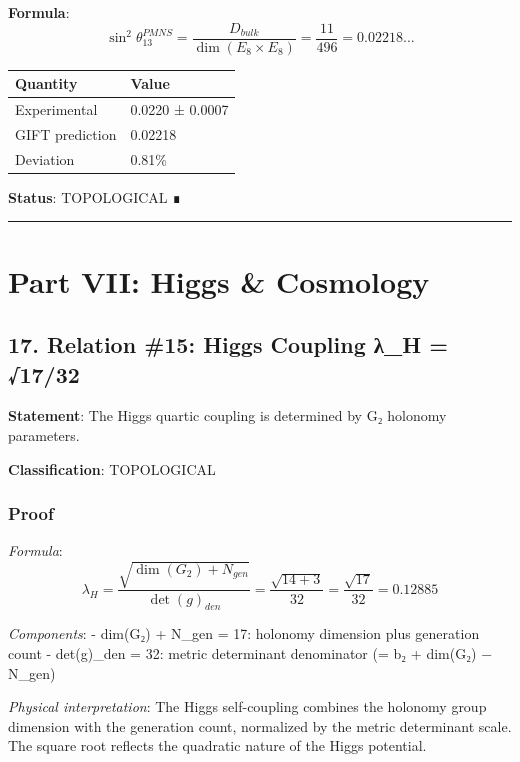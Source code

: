 \documentclass[11pt,a4paper]{article}
\begin{document}
\textbf{Formula}:
\[\sin^2\theta_{13}^{PMNS} = \frac{D_{bulk}}{\dim(E_8 \times E_8)} = \frac{11}{496} = 0.02218...\]

{\def\LTcaptype{none} %
\begin{longtable}[]{@{}ll@{}}
\toprule\noalign{}
Quantity & Value \\
\midrule\noalign{}
\endhead
\bottomrule\noalign{}
\endlastfoot
Experimental & 0.0220 ± 0.0007 \\
GIFT prediction & 0.02218 \\
Deviation & 0.81\% \\
\end{longtable}
}

\textbf{Status}: TOPOLOGICAL ∎

\begin{center}\rule{0.5\linewidth}{0.5pt}\end{center}

\section{Part VII: Higgs \& Cosmology}\label{part-vii-higgs-cosmology}

\subsection{17. Relation \#15: Higgs Coupling λ\_H = √17/32}\label{relation-15-higgs-coupling-ux3bb_h-1732}

\textbf{Statement}: The Higgs quartic coupling is determined by G₂ holonomy parameters.

\textbf{Classification}: TOPOLOGICAL

\subsubsection{Proof}\label{proof-19}

\emph{Formula}:
\[\lambda_H = \frac{\sqrt{\dim(G_2) + N_{gen}}}{\det(g)_{den}} = \frac{\sqrt{14 + 3}}{32} = \frac{\sqrt{17}}{32} = 0.12885\]

\emph{Components}:
- dim(G₂) + N\_gen = 17: holonomy dimension plus generation count
- det(g)\_den = 32: metric determinant denominator (= b₂ + dim(G₂) − N\_gen)

\emph{Physical interpretation}:
The Higgs self-coupling combines the holonomy group dimension with the generation count, normalized by the metric determinant scale. The square root reflects the quadratic nature of the Higgs potential.
\end{document}
